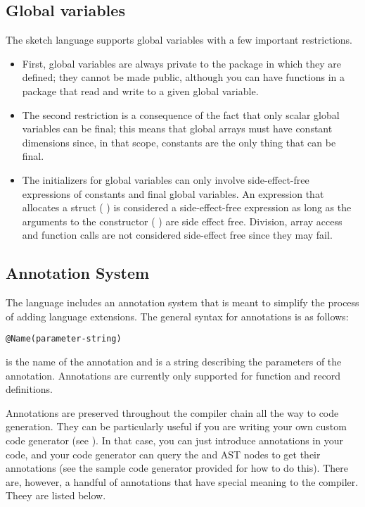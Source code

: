 \subsection{Global variables}
The sketch language supports global variables with a few important restrictions.
\begin{itemize}
\item First, global variables are always private to the package in which they are defined; they cannot be made public, although you can have functions in a package that read and write to a given global variable.
\item The second restriction is a consequence of the fact that only scalar global variables can be final; this means that global arrays must have constant dimensions since, in that scope, constants are the only thing that can be final.

\item The initializers for global variables can only involve side-effect-free expressions of constants and final global variables. An expression that allocates a struct (\eg{} ) is considered a side-effect-free expression as long as the arguments to the constructor (\eg{} ) are side effect free. Division, array access and function calls are not considered side-effect free since they may fail.
\end{itemize}

\subsection{Annotation System}
The \Sk{} language includes an annotation system that is meant to simplify the process of adding language extensions. The general syntax for annotations is as follows:
\begin{lstlisting}
@Name(parameter-string)
\end{lstlisting}
 is the name of the annotation and  is a string describing the parameters of the annotation. Annotations are currently only supported for function and record definitions.


Annotations are preserved throughout the compiler chain all the way to code generation. They can be particularly useful if you are writing your own custom code generator (see ). In that case, you can just introduce annotations in your code, and your code generator can query the  and   AST nodes to get their annotations (see the sample code generator provided for how to do this). There are, however, a handful of annotations that have special meaning to the compiler. Theey are listed below.


